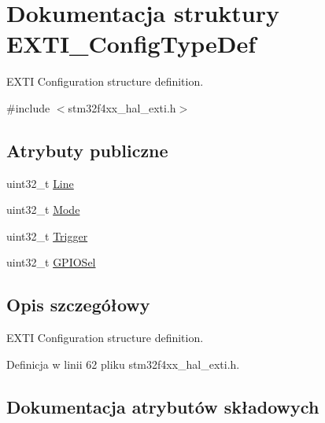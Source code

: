 \hypertarget{struct_e_x_t_i___config_type_def}{}\section{Dokumentacja struktury E\+X\+T\+I\+\_\+\+Config\+Type\+Def}
\label{struct_e_x_t_i___config_type_def}


E\+X\+TI Configuration structure definition.  




{\ttfamily \#include $<$stm32f4xx\+\_\+hal\+\_\+exti.\+h$>$}

\subsection*{Atrybuty publiczne}
\begin{DoxyCompactItemize}
\item 
uint32\+\_\+t \hyperlink{struct_e_x_t_i___config_type_def_a19ad88703f9ac13e8a741afdba86f6af}{Line}
\item 
uint32\+\_\+t \hyperlink{struct_e_x_t_i___config_type_def_a6393a89a8cd198b19e10876e6f12cf5b}{Mode}
\item 
uint32\+\_\+t \hyperlink{struct_e_x_t_i___config_type_def_acf6d2ea84df5f2b705676584ae00707a}{Trigger}
\item 
uint32\+\_\+t \hyperlink{struct_e_x_t_i___config_type_def_acb9a59bb7943a21c105481f85007a79c}{G\+P\+I\+O\+Sel}
\end{DoxyCompactItemize}


\subsection{Opis szczegółowy}
E\+X\+TI Configuration structure definition. 

Definicja w linii 62 pliku stm32f4xx\+\_\+hal\+\_\+exti.\+h.



\subsection{Dokumentacja atrybutów składowych}
\mbox{\label{struct_e_x_t_i___config_type_def_acb9a59bb7943a21c105481f85007a79c}} 
